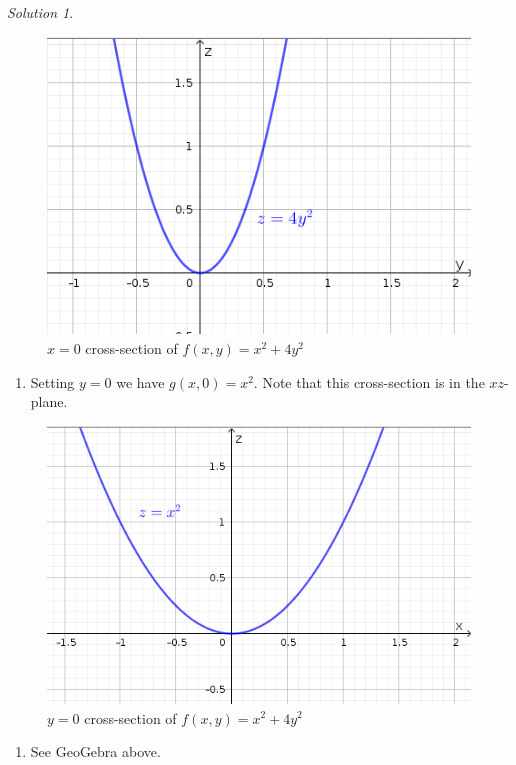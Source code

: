 \documentclass[
]{book}
\providecommand{\tightlist}{%
  \setlength{\itemsep}{0pt}\setlength{\parskip}{0pt}}
\theoremstyle{definition}
\theoremstyle{definition}
\theoremstyle{definition}
\theoremstyle{definition}
\theoremstyle{remark}
\newtheorem*{solution}{Solution}
\begin{document}
\begin{solution}
\begin{figure}

{\centering \includegraphics[width=0.5\linewidth]{images/x0-g} 

}

\caption{$x=0$ cross-section of $f(x,y)=x^2+4y^2$}\label{fig:unnamed-chunk-5}
\end{figure}

\begin{enumerate}
\def\labelenumi{\alph{enumi}.}
\setcounter{enumi}{3}
\tightlist
\item
  Setting \(y=0\) we have \(g(x,0)=x^2\). Note that this cross-section is in the \(xz\)-plane.
\end{enumerate}

\begin{figure}

{\centering \includegraphics[width=0.5\linewidth]{images/y-0g} 

}

\caption{$y=0$ cross-section of $f(x,y)=x^2+4y^2$}\label{fig:unnamed-chunk-6}
\end{figure}

\begin{enumerate}
\def\labelenumi{\alph{enumi}.}
\setcounter{enumi}{4}
\tightlist
\item
  See GeoGebra above.
\end{enumerate}

\end{solution}
\end{document}
